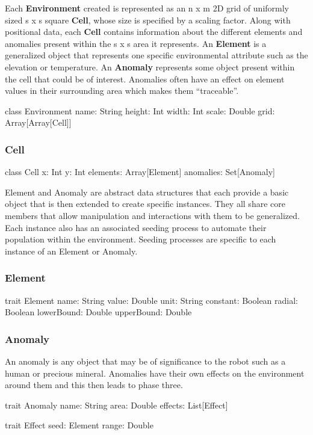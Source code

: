 Each \textbf{Environment} created is represented as an n x m 2D grid of uniformly sized s x s square \textbf{Cell}, whose size is specified by a scaling factor.
Along with positional data, each \textbf{Cell} contains information about the different elements and anomalies present within the s x s area it represents.
An \textbf{Element} is a generalized object that represents one specific environmental attribute such as the elevation or temperature.
An \textbf{Anomaly} represents some object present within the cell that could be of interest.
Anomalies often have an effect on element values in their surrounding area which makes them “traceable”.

class Environment {
	name: String
  height: Int
  width: Int
  scale: Double
	grid: Array[Array[Cell]]
}

\subsubsection{Cell}

class Cell {
  x: Int
  y: Int
  elements: Array[Element]
  anomalies: Set[Anomaly]
}

Element and Anomaly are abstract data structures that each provide a basic object that is then extended to create specific instances.
They all share core members that allow manipulation and interactions with them to be generalized.
Each instance also has an associated seeding process to automate their population within the environment.
Seeding processes are specific to each instance of an Element or Anomaly.

\subsubsection{Element}

trait Element {
  name: String
  value: Double
  unit: String
  constant: Boolean
  radial: Boolean
  lowerBound: Double
  upperBound: Double
}

\subsubsection{Anomaly}
An anomaly is any object that may be of significance to the robot such as a human or precious mineral.
Anomalies have their own effects on the environment around them and this then leads to phase three.

trait Anomaly {
  name: String
  area: Double
  effects: List[Effect]
}

trait Effect {
  seed: Element
  range: Double
}

